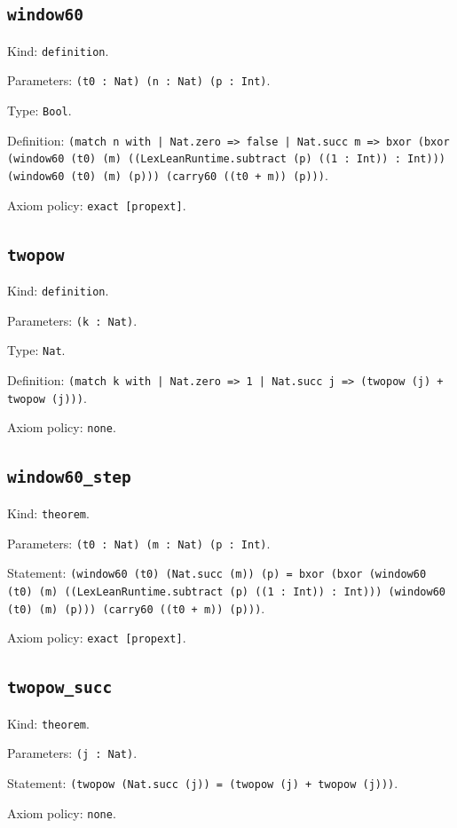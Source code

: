 \documentclass[11pt]{article}
\begin{document}
\subsection*{\texttt{window60}}
\noindent Kind: \texttt{definition}.\par
\noindent Parameters: \texttt{(t0 : Nat) (n : Nat) (p : Int)}.\par
\noindent Type: \texttt{Bool}.\par
\noindent Definition: \texttt{(match n with | Nat.zero => false | Nat.succ m => bxor (bxor (window60 (t0) (m) ((LexLeanRuntime.subtract (p) ((1 : Int)) : Int))) (window60 (t0) (m) (p))) (carry60 ((t0 + m)) (p)))}.\par
\noindent Axiom policy: \texttt{exact [propext]}.\par
\subsection*{\texttt{twopow}}
\noindent Kind: \texttt{definition}.\par
\noindent Parameters: \texttt{(k : Nat)}.\par
\noindent Type: \texttt{Nat}.\par
\noindent Definition: \texttt{(match k with | Nat.zero => 1 | Nat.succ j => (twopow (j) + twopow (j)))}.\par
\noindent Axiom policy: \texttt{none}.\par
\subsection*{\texttt{window60\_step}}
\noindent Kind: \texttt{theorem}.\par
\noindent Parameters: \texttt{(t0 : Nat) (m : Nat) (p : Int)}.\par
\noindent Statement: \texttt{(window60 (t0) (Nat.succ (m)) (p) = bxor (bxor (window60 (t0) (m) ((LexLeanRuntime.subtract (p) ((1 : Int)) : Int))) (window60 (t0) (m) (p))) (carry60 ((t0 + m)) (p)))}.\par
\noindent Axiom policy: \texttt{exact [propext]}.\par
\subsection*{\texttt{twopow\_succ}}
\noindent Kind: \texttt{theorem}.\par
\noindent Parameters: \texttt{(j : Nat)}.\par
\noindent Statement: \texttt{(twopow (Nat.succ (j)) = (twopow (j) + twopow (j)))}.\par
\noindent Axiom policy: \texttt{none}.\par
\end{document}
